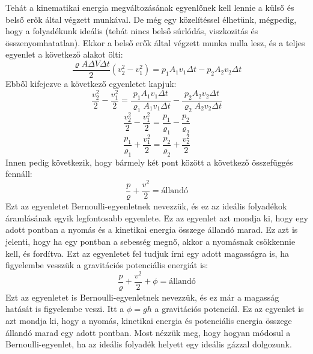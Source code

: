 \documentclass[../main.tex]{subfiles}
\begin{document}
Tehát a kinematikai energia megváltozásának egyenlőnek kell lennie a külső és belső erők által végzett munkával. De még egy közelítéssel élhetünk,
mégpedig, hogy a folyadékunk ideális (tehát nincs belső súrlódás, viszkozitás és összenyomhatatlan). Ekkor a belső erők által végzett munka nulla lesz,
és a teljes egyenlet a következő alakot ölti:
\begin{equation}
    \frac{\varrho A \Delta V \Delta t}{2} (v_2^2 - v_1^2) = p_1 A_1 v_1 \Delta t - p_2 A_2 v_2 \Delta t
\end{equation}
Ebből kifejezve a következő egyenletet kapjuk:
\begin{equation}
    \frac{v_2^2}{2} - \frac{v_1^2}{2} = \frac{p_1 A_1 v_1 \Delta t}{\varrho_1 A_1 v_1 \Delta t} - \frac{p_2 A_2 v_2 \Delta t}{\varrho_2 A_2 v_2 \Delta t}
\end{equation}
\begin{equation}
    \frac{v_2^2}{2} - \frac{v_1^2}{2} = \frac{p_1}{\varrho_1} - \frac{p_2}{\varrho_2}
\end{equation}
\begin{equation}
    \frac{p_1}{\varrho_1} + \frac{v_1^2}{2} = \frac{p_2}{\varrho_2} + \frac{v_2^2}{2}
\end{equation}
Innen pedig következik, hogy bármely két pont között a következő összefüggés fennáll:
\begin{equation}
    \frac{p}{\varrho} + \frac{v^2}{2} = \text{állandó}
\end{equation}
Ezt az egyenletet Bernoulli-egyenletnek nevezzük, és ez az ideális folyadékok áramlásának egyik legfontosabb egyenlete. Ez az egyenlet azt mondja ki, hogy egy adott pontban a nyomás
és a kinetikai energia összege állandó marad. Ez azt is jelenti, hogy ha egy pontban a sebesség megnő, akkor a nyomásnak csökkennie kell, és fordítva.
Ezt az egyenletet fel tudjuk írni egy adott magasságra is, ha figyelembe vesszük a gravitációs potenciális energiát is:
\begin{equation}
    \frac{p}{\varrho} + \frac{v^2}{2} + \phi = \text{állandó}
\end{equation}
Ezt az egyenletet is Bernoulli-egyenletnek nevezzük, és ez már a magasság hatását is figyelembe veszi. Itt a $\phi = gh$ a gravitációs potenciál.
Ez az egyenlet is azt mondja ki, hogy a nyomás, kinetikai energia és potenciális energia összege állandó marad egy adott pontban.
\newline
\newline
Most nézzük meg, hogy hogyan módosul a Bernoulli-egyenlet, ha az ideális folyadék helyett egy ideális gázzal dolgozunk.
\end{document}
